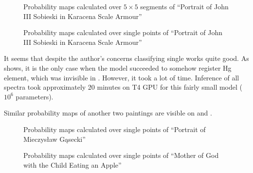 \begin{figure}[htbp!]
  \centering
  
  \caption{Probability maps calculated over $5\times5$ segments of ``Portrait of John III Sobieski in Karacena Scale Armour''}
  \label{fig:5x5-point-sobieski}
\end{figure}

\newpage
\begin{figure}[H]
  \centering
  
  \caption{Probability maps calculated over single points of ``Portrait of John III Sobieski in Karacena Scale Armour''}
  \label{fig:single-point-sobieski}
\end{figure}
It seems that despite the author's concerns classifying single works quite good.
As  shows, it is the only case when the model succeeded to somehow register Hg element, which was invisible in .
However, it took a lot of time. 
Inference of all spectra took approximately 20 minutes on T4 GPU for this fairly small model ($10^6$ parameters).

Similar probability maps of another two paintings are visible on  and .

\begin{figure}[htbp!]
  \centering
  
  \caption{Probability maps calculated over single points of ``Portrait of Mieczysław Gąsecki''}
  \label{fig:single-point-gasecki}
\end{figure}

\begin{figure}[htbp!]
  \centering
  
  \caption{Probability maps calculated over single points of ``Mother of
God with the Child Eating an Apple''}
  \label{fig:single-point-matka-boska}
\end{figure}